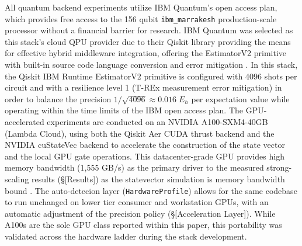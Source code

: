All quantum backend experiments utilize IBM Quantum’s open access plan, which provides free access to the 156 qubit \texttt{ibm\_marrakesh} production-scale processor without a financial barrier for research. IBM Quantum was selected as this stack's cloud QPU provider due 
to their Qiskit library providing the means for effective hybrid middleware integration, offering the EstimatorV2 primitive with built-in source code language conversion and error mitigation \parencite{rallis2025interfacingquantumcomputingsystems}.  
In this stack, the Qiskit IBM Runtime EstimatorV2 primitive is configured with 4096 shots per circuit and with a resilience level 1 (T-REx measurement error mitigation) in order to balance the precision $1/\sqrt{4096} \approx 0.016\;E_h$ per expectation value while 
operating within the time limits of the IBM open access plan. 
The GPU-accelerated experiments are conducted on an NVIDIA A100-SXM4-40GB (Lambda Cloud),
using both the Qiskit Aer CUDA thrust backend and the NVIDIA cuStateVec backend to accelerate the construction of the state vector and the local GPU gate operations. This datacenter-grade GPU provides high memory bandwidth (1,555 GB/s) as the primary driver to the measured strong-scaling results
(\S[Results]) as the statevector simulation is memory bandwidth bound \parencite{bayraktar2023cuquantum}. The auto-detecion layer (\texttt{HardwareProfile}) allows for the same codebase to run unchanged on lower tier consumer 
and workstation GPUs, with an automatic adjustment of the precision policy (\S[Acceleration Layer]). While A100s are the sole GPU class reported within this paper, this 
portability was validated across the hardware ladder during the stack development. 


